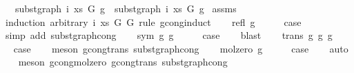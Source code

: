 \begin{isabellebody}
\ \ \ {\isachardoublequoteopen}subst{\isacharunderscore}{\kern0pt}graph\ i\ xs\ G{}\ g{}\ {\isasymsimeq}\ subst{\isacharunderscore}{\kern0pt}graph\ i\ xs\ G{}\ g{}{\isachardoublequoteclose}\isanewline
%
\isadelimproof
%
\endisadelimproof
%
\isatagproof
{}\isamarkupfalse%
\ assms\isanewline
{}\isamarkupfalse%
\ {\isacharparenleft}{\kern0pt}induction\ arbitrary{\isacharcolon}{\kern0pt}\ i\ xs\ G{}\ G{}\ rule{\isacharcolon}{\kern0pt}\ gcong{\isachardot}{\kern0pt}induct{\isacharparenright}{\kern0pt}\isanewline
\ \ \isamarkupfalse%
\ {\isacharparenleft}{\kern0pt}refl\ g{\isacharparenright}{\kern0pt}\isanewline
\ \ \isamarkupfalse%
\ \isamarkupfalse%
\ {\isacharquery}{\kern0pt}case\isanewline
\ \ \isamarkupfalse%
\ {\isacharparenleft}{\kern0pt}simp\ add{\isacharcolon}{\kern0pt}\ subst{\isacharunderscore}{\kern0pt}graph{\isacharunderscore}{\kern0pt}cong{}{\isacharparenright}{\kern0pt}\isanewline
{}\isamarkupfalse%
\isanewline
\ \ \isamarkupfalse%
\ {\isacharparenleft}{\kern0pt}sym\ g{}\ g{}{\isacharparenright}{\kern0pt}\isanewline
\ \ \isamarkupfalse%
\ \isamarkupfalse%
\ {\isacharquery}{\kern0pt}case\isanewline
\ \ \isamarkupfalse%
\ blast\isanewline
{}\isamarkupfalse%
\isanewline
\ \ \isamarkupfalse%
\ {\isacharparenleft}{\kern0pt}trans\ g{}\ g{}\ g{}{\isacharparenright}{\kern0pt}\isanewline
\ \ \isamarkupfalse%
\ \isamarkupfalse%
\ {\isacharquery}{\kern0pt}case\isanewline
\ \ \isamarkupfalse%
\ {\isacharparenleft}{\kern0pt}meson\ gcong{\isachardot}{\kern0pt}trans\ subst{\isacharunderscore}{\kern0pt}graph{\isacharunderscore}{\kern0pt}cong{\isacharparenright}{\kern0pt}\isanewline
{}\isamarkupfalse%
\isanewline
\ \ \isamarkupfalse%
\ {\isacharparenleft}{\kern0pt}mol{\isacharunderscore}{\kern0pt}zero\ g{\isacharparenright}{\kern0pt}\isanewline
\ \ \isamarkupfalse%
\ \isamarkupfalse%
\ {\isacharquery}{\kern0pt}case\isanewline
\ \ \isamarkupfalse%
\ auto\isanewline
\ \ \isamarkupfalse%
\ {\isacharparenleft}{\kern0pt}meson\ gcong{\isachardot}{\kern0pt}mol{\isacharunderscore}{\kern0pt}zero\ gcong{\isachardot}{\kern0pt}trans\ subst{\isacharunderscore}{\kern0pt}graph{\isacharunderscore}{\kern0pt}cong{}{\isacharparenright}{\kern0pt}\isanewline

\end{isabellebody}
